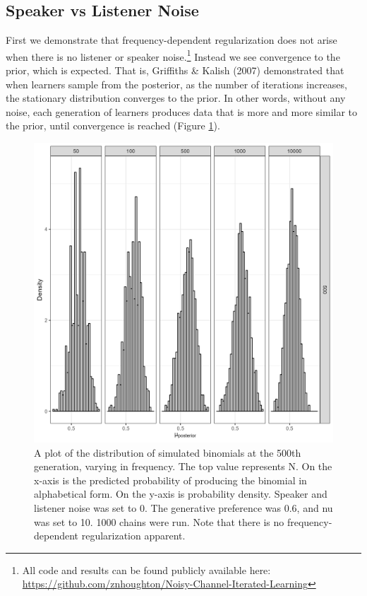 \documentclass[10pt, letterpaper]{article}
\newenvironment{CodeChunk}{}{}
\begin{document}
\hypertarget{speaker-vs-listener-noise}{%
\subsection{Speaker vs Listener Noise}\label{speaker-vs-listener-noise}}

First we demonstrate that frequency-dependent regularization does not
arise when there is no listener or speaker noise.\footnote{All code and
  results can be found publicly available here:
  \url{https://github.com/znhoughton/Noisy-Channel-Iterated-Learning}}
Instead we see convergence to the prior, which is expected. That is,
Griffiths \& Kalish (2007) demonstrated that when learners sample from
the posterior, as the number of iterations increases, the stationary
distribution converges to the prior. In other words, without any noise,
each generation of learners produces data that is more and more similar
to the prior, until convergence is reached (Figure
\ref{fig:noNoisePlot}).

\begin{CodeChunk}
\begin{figure}[tb]

{\centering \includegraphics[width=1\linewidth]{Figures/noNoise} 

}

\caption[A plot of the distribution of simulated binomials at the 500th generation, varying in frequency]{A plot of the distribution of simulated binomials at the 500th generation, varying in frequency. The top value represents N. On the x-axis is the predicted probability of producing the binomial in alphabetical form. On the y-axis is probability density. Speaker and listener noise was set to 0. The generative preference was 0.6, and nu was set to 10. 1000 chains were run. Note that there is no frequency-dependent regularization apparent.}\label{fig:noNoisePlot}
\end{figure}
\end{CodeChunk}
\end{document}
